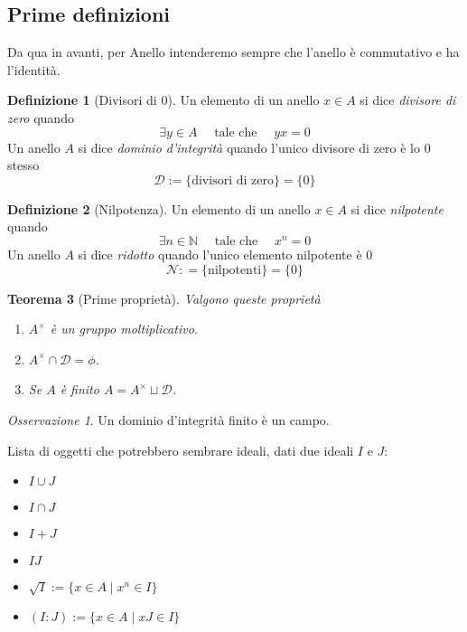\documentclass[a4paper]{article}
\newtheorem{theorem}{Teorema}[section]
\theoremstyle{remark}
\newtheorem*{remark}{Osservazione}
\theoremstyle{definition}
\newtheorem{definition}[theorem]{Definizione}
\begin{document}
\subsection{Prime definizioni}
\begin{multicols}{2}
Da qua in avanti, per Anello intenderemo sempre che l'anello è commutativo e ha l'identità.

\begin{definition}[Divisori di 0]
	Un elemento di un anello $ x \in A $ si dice \emph{divisore di zero} quando
	\[ \exists y \in A \quad\text{    tale che    }\quad yx = 0 \]
	Un anello $ A $ si dice \emph{dominio d'integrità} quando l'unico divisore di zero è lo 0 stesso
	\[ \mathcal{D}:= \{\text{divisori di zero}\} = \{0\} \]
\end{definition}
\begin{definition}[Nilpotenza]
	Un elemento di un anello $ x \in A $ si dice \emph{nilpotente} quando
	 \[ \exists n \in \mathbb{N} \quad\text{    tale che    }\quad x^n = 0 \]
	 Un anello $ A $ si dice \emph{ridotto} quando l'unico elemento nilpotente è 0
	 \[ \mathcal{N}: = \{\text{nilpotenti}\} = \{0\} \]
\end{definition}

\begin{theorem}[Prime proprietà]
	Valgono queste proprietà
	\begin{enumerate}
		\item $ A^\times $ è un gruppo moltiplicativo.
		\item $ A^\times \cap \mathcal{D} = \phi $.
		\item Se $ A $ è finito $ A = A^\times \sqcup \mathcal{D} $.
	\end{enumerate}
\end{theorem}
\begin{remark}
	Un dominio d'integrità finito è un campo.
\end{remark}

Lista di oggetti che potrebbero sembrare ideali, dati due ideali $ I $ e $ J $:
\begin{itemize}
	\item  $ I \cup J $
	\item  $ I \cap J $
	\item $ I + J $
	\item  $ IJ $
	\item $ \sqrt{I} := \{ x \in A \mid x^n \in I \} $
	\item $ (I:J) := \{ x \in A \mid xJ \in I \} $
\end{itemize}



\end{multicols}
\end{document}
